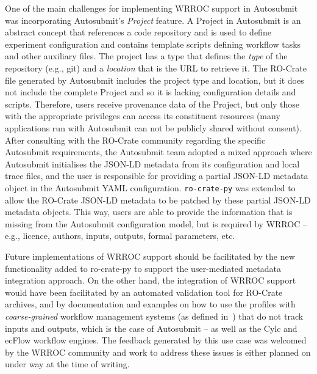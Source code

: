\documentclass[10pt,letterpaper]{article}
\begin{document}
One of the main challenges for implementing WRROC support in Autosubmit was incorporating Autosubmit's \emph{Project} feature.
%
A Project in Autosubmit is an abstract concept that references a code repository and is used to define experiment configuration and contains template scripts defining workflow tasks and other auxiliary files.
%
%
The project has a type that defines the \emph{type} of the repository (e.g., git) and a \emph{location} that is the URL to retrieve it.
The RO-Crate file generated by Autosubmit includes the project type and location, but it does not include the complete Project and so it is lacking configuration details and scripts.
Therefore, users receive provenance data of the Project, but only those with the appropriate privileges can access its constituent resources (many applications run with Autosubmit can not be publicly shared without consent).
%
After consulting with the RO-Crate community regarding the specific Autosubmit requirements, the Autosubmit team adopted a mixed approach where Autosubmit initialises the JSON-LD metadata from its configuration and local trace files, and the user is responsible for providing a partial JSON-LD metadata object in the Autosubmit YAML configuration.
\texttt{ro-crate-py} was extended to allow the RO-Crate JSON-LD metadata to be patched by these partial JSON-LD metadata objects.
This way, users are able to provide the information that is missing from the Autosubmit configuration model, but is required by WRROC -- e.g., licence, authors, inputs, outputs, formal parameters, etc.

Future implementations of WRROC support should be facilitated by the new
functionality added to ro-crate-py to support the user-mediated metadata
integration approach.
%
On the other hand, the integration of WRROC support would have been facilitated by an automated validation tool for RO-Crate archives, and by documentation and examples on how to use the profiles with \emph{coarse-grained} workflow management systems (as defined in~\cite{Goble 2020}) that do not track inputs and outputs, which is the case of Autosubmit -- as well as the Cylc and ecFlow workflow engines.  The feedback generated by this use case was welcomed by the WRROC community and work to address these issues is either planned on under way at the time of writing.
\end{document}
